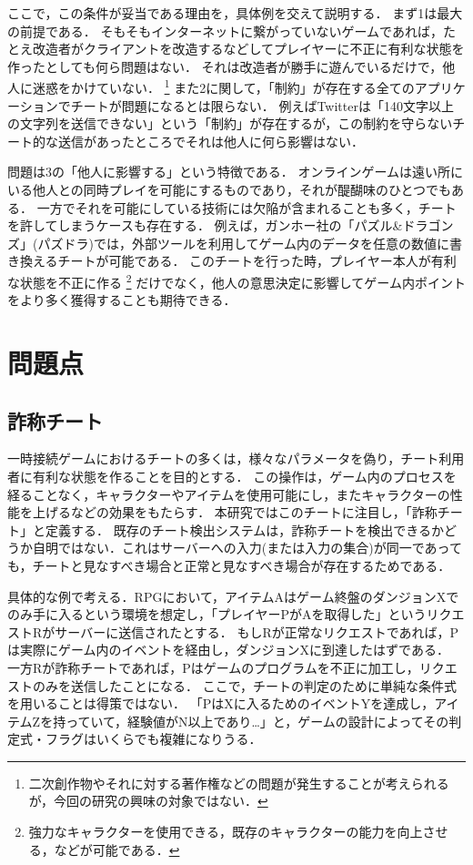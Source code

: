 ここで，この条件が妥当である理由を，具体例を交えて説明する．
まず1は最大の前提である．
そもそもインターネットに繋がっていないゲームであれば，たとえ改造者がクライアントを改造するなどしてプレイヤーに不正に有利な状態を作ったとしても何ら問題はない．
それは改造者が勝手に遊んでいるだけで，他人に迷惑をかけていない．
\footnote{二次創作物やそれに対する著作権などの問題が発生することが考えられるが，今回の研究の興味の対象ではない．}
また2に関して，「制約」が存在する全てのアプリケーションでチートが問題になるとは限らない．
例えばTwitterは「140文字以上の文字列を送信できない」という「制約」が存在するが，この制約を守らないチート的な送信があったところでそれは他人に何ら影響はない．

問題は3の「他人に影響する」という特徴である．
オンラインゲームは遠い所にいる他人との同時プレイを可能にするものであり，それが醍醐味のひとつでもある．
一方でそれを可能にしている技術には欠陥が含まれることも多く，チートを許してしまうケースも存在する．
例えば，ガンホー社の「パズル\&ドラゴンズ」(パズドラ)では，外部ツール\cite{ghostrouter}を利用してゲーム内のデータを任意の数値に書き換えるチートが可能である．
このチートを行った時，プレイヤー本人が有利な状態を不正に作る
\footnote{強力なキャラクターを使用できる，既存のキャラクターの能力を向上させる，などが可能である．}
だけでなく，他人の意思決定に影響してゲーム内ポイントをより多く獲得することも期待できる．

\section{問題点}
\subsection{詐称チート}
一時接続ゲームにおけるチートの多くは，様々なパラメータを偽り，チート利用者に有利な状態を作ることを目的とする．
この操作は，ゲーム内のプロセスを経ることなく，キャラクターやアイテムを使用可能にし，またキャラクターの性能を上げるなどの効果をもたらす．
本研究ではこのチートに注目し，「詐称チート」と定義する．
既存のチート検出システムは，詐称チートを検出できるかどうか自明ではない．これはサーバーへの入力(または入力の集合)が同一であっても，チートと見なすべき場合と正常と見なすべき場合が存在するためである．

具体的な例で考える．RPGにおいて，アイテムAはゲーム終盤のダンジョンXでのみ手に入るという環境を想定し，「プレイヤーPがAを取得した」というリクエストRがサーバーに送信されたとする．
もしRが正常なリクエストであれば，Pは実際にゲーム内のイベントを経由し，ダンジョンXに到達したはずである．
一方Rが詐称チートであれば，Pはゲームのプログラムを不正に加工し，リクエストのみを送信したことになる．
ここで，チートの判定のために単純な条件式を用いることは得策ではない．
「PはXに入るためのイベントYを達成し，アイテムZを持っていて，経験値がN以上であり…」と，ゲームの設計によってその判定式・フラグはいくらでも複雑になりうる．

